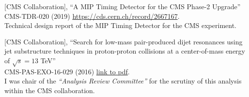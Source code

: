 \documentclass[10pt, a4paper]{article}
\begin{document}
\begin{thebibliography}{599}
  [CMS Collaboration], 
  ``A MIP Timing Detector for the CMS Phase-2 Upgrade''\\
  CMS-TDR-020 (2019)
  \href{https://cds.cern.ch/record/2667167}{https://cds.cern.ch/record/2667167}.
  \\ Technical design report of the MIP Timing Detector for the CMS experiment.

  [CMS Collaboration], 
  ``Search for low-mass
  pair-produced dijet resonances using jet substructure techniques in
  proton-proton collisions at a center-of-mass energy of $\sqrt{s}=13$
  TeV''\\
  CMS-PAS-EXO-16-029 (2016)
  \href{http://cds.cern.ch/record/2231062/files/EXO-16-029-pas.pdf}{link
    to pdf}.
  \\ I was chair of the {\it``Analysis Review Committee''} for the scrutiny of this analysis within the CMS collaboration. 




\end{thebibliography}
\end{document}
